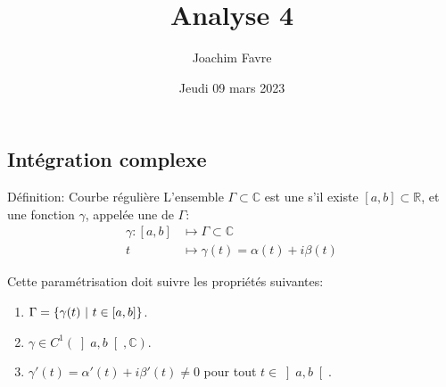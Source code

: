 \documentclass[a4paper]{article}
\title{Analyse 4}
\author{Joachim Favre}
\date{Jeudi 09 mars 2023}
\begin{document}
\maketitle


\subsection{Intégration complexe}
\begin{parag}{Définition: Courbe régulière}
    L'ensemble $\Gamma \subset \mathbb{C}$ est une  s'il existe $\left[a, b\right] \subset \mathbb{R}$, et une fonction $\gamma$, appelée une  de $\Gamma$:
    \[\begin{split}
    \gamma: \left[a, b\right] &\longmapsto \Gamma \subset \mathbb{C} \\
    t &\longmapsto \gamma\left(t\right) = \alpha\left(t\right) + i\beta\left(t\right)
    \end{split}\]
    
    Cette paramétrisation doit suivre les propriétés suivantes:
    \begin{enumerate}
        \item $\Gamma = \left\{\gamma\left(t\right) \suchthat t \in \left[a, b\right]\right\}$.
        \item $\gamma \in C^{1}\left(\left]a, b\right[, \mathbb{C}\right)$.
        \item $\gamma'\left(t\right) = \alpha'\left(t\right) + i \beta'\left(t\right) \neq 0$ pour tout $t \in \left]a, b\right[$.
    \end{enumerate}
\end{parag}
\end{document}
